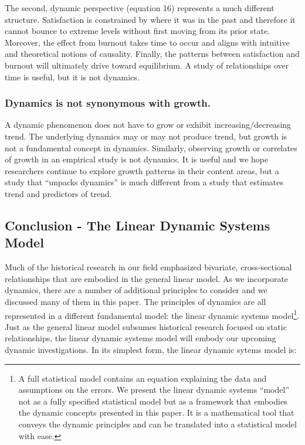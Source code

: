 \documentclass[english,,man]{apa6}
\let\rmarkdownfootnote\footnote%
\def\footnote{\protect\rmarkdownfootnote}
\theoremstyle{definition}
\theoremstyle{definition}
\theoremstyle{definition}
\theoremstyle{remark}
\begin{document}
The second, dynamic perspective (equation 16) represents a much
different structure. Satisfaction is constrained by where it was in the
past and therefore it cannot bounce to extreme levels without first
moving from its prior state. Moreover, the effect from burnout takes
time to occur and aligns with intuitive and theoretical notions of
causality. Finally, the patterns between satisfaction and burnout will
ultimately drive toward equilibrium. A study of relationships over time
is useful, but it is not dynamics.

\hypertarget{dynamics-is-not-synonymous-with-growth.}{%
\subsubsection{Dynamics is not synonymous with
growth.}\label{dynamics-is-not-synonymous-with-growth.}}

A dynamic phenomenon does not have to grow or exhibit
increasing/decreasing trend. The underlying dynamics may or may not
produce trend, but growth is not a fundamental concept in dynamics.
Similarly, observing growth or correlates of growth in an empirical
study is not dynamics. It is useful and we hope researchers continue to
explore growth patterns in their content areas, but a study that
\enquote{unpacks dynamics} is much different from a study that estimates
trend and predictors of trend.

\hypertarget{conclusion---the-linear-dynamic-systems-model}{%
\subsection{Conclusion - The Linear Dynamic Systems
Model}\label{conclusion---the-linear-dynamic-systems-model}}

Much of the historical research in our field emphasized bivariate,
cross-sectional relationships that are embodied in the general linear
model. As we incorporate dynamics, there are a number of additional
principles to consider and we discussed many of them in this paper. The
principles of dynamics are all represented in a different fundamental
model: the linear dynamic systems model\footnote{A full statistical
  model contains an equation explaining the data and assumptions on the
  errors. We present the linear dynamic systems \enquote{model} not as a
  fully specified statistical model but as a framework that embodies the
  dynamic concepts presented in this paper. It is a mathematical tool
  that conveys the dynamic principles and can be translated into a
  statistical model with ease.}. Just as the general linear model
subsumes historical research focused on static relationships, the linear
dynamic systems model will embody our upcoming dynamic investigations.
In its simplest form, the linear dynamic sytems model is:
\end{document}
